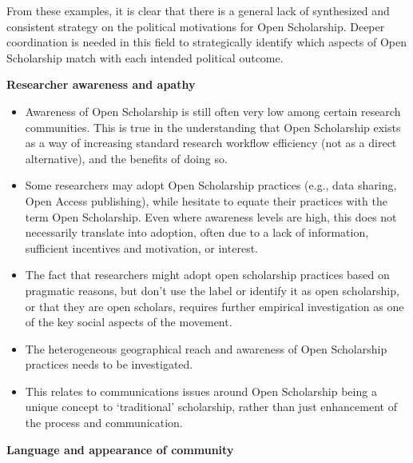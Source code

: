 From these examples, it is clear that there is a general lack of
synthesized and consistent strategy on the political motivations for
Open Scholarship. Deeper coordination is needed in this field to
strategically identify which aspects of Open Scholarship match with each
intended political outcome.

\textbf{Researcher awareness and apathy}

\begin{itemize}
\item
  Awareness of Open Scholarship is still often very low among certain
  research communities. This is true in the understanding that Open
  Scholarship exists as a way of increasing standard research workflow
  efficiency (not as a direct alternative), and the benefits of doing
  so.
\item
  Some researchers may adopt Open Scholarship practices (e.g., data
  sharing, Open Access publishing), while hesitate to equate their
  practices with the term Open Scholarship. Even where awareness levels
  are high, this does not necessarily translate into adoption, often due
  to a lack of information, sufficient incentives and motivation, or
  interest.
\item
  The fact that researchers might adopt open scholarship practices based
  on pragmatic reasons, but don't use the label or identify it as open
  scholarship, or that they are open scholars, requires further
  empirical investigation as one of the key social aspects of the
  movement.
\item
  The heterogeneous geographical reach and awareness of Open Scholarship
  practices needs to be investigated.
\item
  This relates to communications issues around Open Scholarship being a
  unique concept to `traditional' scholarship, rather than just
  enhancement of the process and communication.
\end{itemize}

\textbf{Language and appearance of community}

